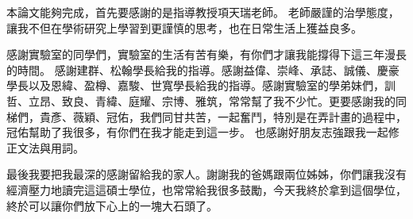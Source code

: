 本論文能夠完成，首先要感謝的是指導教授項天瑞老師。
老師嚴謹的治學態度，讓我不但在學術研究上學習到更謹慎的思考，也在日常生活上獲益良多。


感謝實驗室的同學們，實驗室的生活有苦有樂，有你們才讓我能撐得下這三年漫長的時間。
感謝建群、松翰學長給我的指導。感謝益偉、崇峰、承誌、誠儀、慶豪學長以及恩緯、盈樽、嘉駿、世寬學長給我的指導。感謝實驗室的學弟妹們，訓哲、立昂、致良、青緯、庭耀、宗博、雅筑，常常幫了我不少忙。更要感謝我的同梯們，貴彥、薇穎、冠佑，我們同甘共苦，一起奮鬥，特別是在弄計畫的過程中，冠佑幫助了我很多，有你們在我才能走到這一步。
也感謝好朋友志強跟我一起修正文法與用詞。

最後我要把我最深的感謝留給我的家人。謝謝我的爸媽跟兩位姊姊，你們讓我沒有經濟壓力地讀完這這碩士學位，也常常給我很多鼓勵，今天我終於拿到這個學位，終於可以讓你們放下心上的一塊大石頭了。